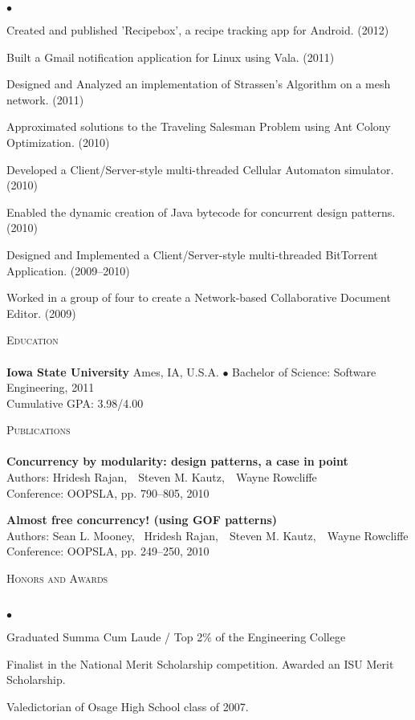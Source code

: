 \documentclass{article}
\newcommand{\lineunder} {
	\vspace*{-8pt} \\ \hspace*{-18pt} \hrulefill \\
}
\newcommand{\header}[1] {
	{\hspace*{-15pt}\vspace*{6pt} \textsc{#1}} \vspace*{-6pt} \lineunder
}
\newcommand{\paper}[5] {
	{\textbf{#1}\\ \hspace*{15pt}Authors: #2\\ \hspace*{15pt}#3, #4, #5\\ \vspace*{8pt}}
}
\newenvironment{achievements} {
	\begin{list}{$\bullet$}
		{\topsep 0pt \itemsep -2pt}
	}{
		\vspace*{4pt}\end{list}
	}
\newcommand{\school}[4] {
	\textbf{#1} #2 $\bullet$ #3\\
	\hspace*{15pt}#4 \\
	\vspace*{5pt}
}
\begin{document}
   \begin{achievements}
       \item{Created and published 'Recipebox', a recipe tracking app for Android. (2012)}
       \item{Built a Gmail notification application for Linux using Vala. (2011)}
       \item{Designed and Analyzed an implementation of Strassen's Algorithm on a mesh network. (2011)}
       \item{Approximated solutions to the Traveling Salesman Problem using Ant Colony Optimization. (2010)}
       \item{Developed a Client/Server-style multi-threaded Cellular Automaton simulator. (2010)}
       \item{Enabled the dynamic creation of Java bytecode for concurrent design patterns. (2010)}
       \item{Designed and Implemented a Client/Server-style multi-threaded BitTorrent Application. (2009--2010)}
       \item{Worked in a group of four to create a Network-based Collaborative Document Editor. (2009)}
   \end{achievements}


\header{Education}

	\school{Iowa State University}{Ames, IA, U.S.A.}{Bachelor of Science: Software Engineering, 2011}
	{Cumulative GPA: 3.98/4.00}

\header{Publications}

   \paper{Concurrency by modularity: design patterns, a case in point}{Hridesh Rajan,~ Steven M. Kautz,~ Wayne Rowcliffe}
      {Conference: OOPSLA}{pp. 790--805}{2010}
   \paper{Almost free concurrency! (using GOF patterns)}{Sean L. Mooney,~ Hridesh Rajan,~ Steven M. Kautz,~ Wayne Rowcliffe}
      {Conference: OOPSLA}{pp. 249--250}{2010}


\header{Honors and Awards}

	\begin{achievements}
		\item{Graduated Summa Cum Laude / Top 2\% of the Engineering College}
		\item{Finalist in the National Merit Scholarship competition. Awarded an ISU Merit Scholarship.}
		\item{Valedictorian of Osage High School class of 2007.}
	\end{achievements}
\end{document}
